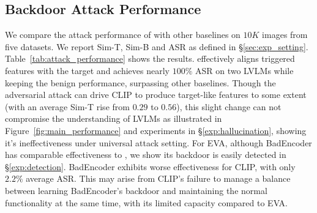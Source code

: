 \subsection{Backdoor Attack Performance}
\label{sec:exp_attack_perfor}
We compare the attack performance of \project with other baselines on $10K$ images from five datasets. We report Sim-T, Sim-B and ASR as defined in \S\ref{sec:exp_setting}. Table~\ref{tab:attack_performance} shows the results. \project effectively aligns triggered features with the target and achieves nearly $100\%$ ASR on two LVLMs while keeping the benign performance, surpassing other baselines. Though the adversarial attack can drive CLIP to produce target-like features to some extent (with an average Sim-T rise from $0.29$ to $0.56$), this slight change can not compromise the understanding of LVLMs as illustrated in Figure~\ref{fig:main_performance} and experiments in \S\ref{exp:hallucination}, showing it's ineffectiveness under universal attack setting. For EVA, although BadEncoder has comparable effectiveness to \project, we show its backdoor is easily detected in \S\ref{exp:detection}. BadEncoder exhibits worse effectiveness for CLIP, with only $2.2\%$ average ASR. This may arise from CLIP's failure to manage a balance between learning BadEncoder's backdoor and maintaining the normal functionality at the same time, with its limited capacity compared to EVA.

